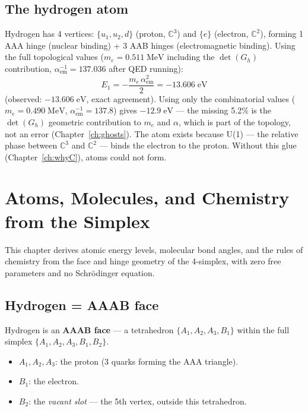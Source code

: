 \documentclass[12pt]{article}
\theoremstyle{remark}
\theoremstyle{definition}
\newcommand{\CC}{\mathbb{C}}
\begin{document}
\subsection{The hydrogen atom}

Hydrogen has 4 vertices: $\{u_1, u_2, d\}$ (proton, $\CC^3$) and $\{e\}$ (electron, $\CC^2$), forming 1 AAA hinge (nuclear binding) + 3 AAB hinges (electromagnetic binding). Using the full topological values ($m_e = 0.511\;\text{MeV}$ including the $\det(G_h)$ contribution, $\alpha_\text{em}^{-1} = 137.036$ after QED running):
\begin{equation}
E_1 = -\frac{m_e\,\alpha_\text{em}^2}{2} = -13.606\;\text{eV}
\end{equation}
(observed: $-13.606\;\text{eV}$, exact agreement). Using only the combinatorial values ($m_e = 0.490\;\text{MeV}$, $\alpha_\text{em}^{-1} = 137.8$) gives $-12.9\;\text{eV}$ --- the missing 5.2\% is the $\det(G_h)$ geometric contribution to $m_e$ and $\alpha$, which is part of the topology, not an error (Chapter~\ref{ch:ghosts}). The atom exists because U(1) --- the relative phase between $\CC^3$ and $\CC^2$ --- binds the electron to the proton. Without this glue (Chapter~\ref{ch:whyC}), atoms could not form.



\section{Atoms, Molecules, and Chemistry from the Simplex}
\label{ch:atoms}

This chapter derives atomic energy levels, molecular bond angles, and the rules of chemistry from the face and hinge geometry of the 4-simplex, with zero free parameters and no Schr\"odinger equation.

\subsection{Hydrogen = AAAB face}

Hydrogen is an \textbf{AAAB face} --- a tetrahedron $\{A_1, A_2, A_3, B_1\}$ within the full simplex $\{A_1, A_2, A_3, B_1, B_2\}$.

\begin{itemize}
\item $A_1, A_2, A_3$: the proton (3 quarks forming the AAA triangle).
\item $B_1$: the electron.
\item $B_2$: the \emph{vacant slot} --- the 5th vertex, outside this tetrahedron.
\end{itemize}
\end{document}
